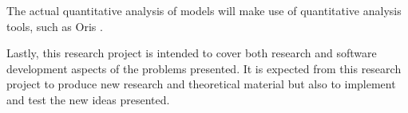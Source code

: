 \documentclass{article}
\begin{document}
        The actual quantitative analysis of models will make use of quantitative analysis tools, such as Oris \cite{bucci2010oris}.
        
        Lastly, this research project is intended to cover both research and software development aspects of the problems presented. It is expected from this research project to produce new research and theoretical material but also to implement and test the new ideas presented.
    
    \clearpage
    
	
	
\end{document}
